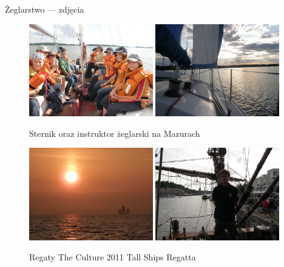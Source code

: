 	\begin{frame}[allowframebreaks]{Żeglarstwo --- zdjęcia}
	\begin{figure}[!htp]
		\includegraphics[width=0.48\textwidth]{img/mazury} 
		\hspace{0.02\textwidth}
		\includegraphics[width=0.48\textwidth]{img/roza} 
		\caption{Sternik oraz instruktor żeglarski na Mazurach}
	\end{figure}

	
	\begin{figure}[!htp]
		\includegraphics[width=0.48\textwidth]{img/tsr2}
		\hspace{0.02\textwidth}
		\includegraphics[width=0.48\textwidth]{img/tsr3}
		\caption{Regaty The Culture 2011 Tall Ships Regatta}
	\end{figure}
	

\end{frame}
